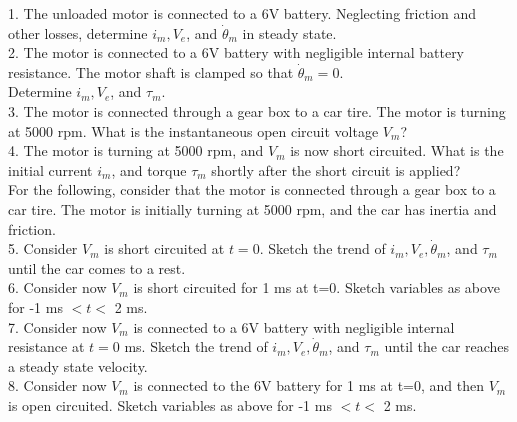 \documentclass[11pt]{article}
\begin{document}
1. The unloaded motor is connected to a 6V battery. 
Neglecting friction and other losses, determine $i_m, V_e$, and $\dot{\theta}_m$ in steady state.\\

2. The motor is connected to a 6V battery with negligible internal battery
resistance. The motor shaft is clamped so that $\dot{\theta}_m = 0$.\\
Determine $i_m, V_e$, and $\tau_m$.\\

3. The motor is connected through a gear box to a car tire. The motor 
is turning at 5000 rpm. What is the instantaneous 
open circuit voltage $V_m$?\\

4. The motor is turning at 5000 rpm, and $V_m$ is now short circuited.
What is the initial current $i_m$, and torque $\tau_m$ shortly 
after the short circuit is applied?\\

For the following, consider that
the motor is connected through a gear box to a car tire. The motor is 
initially turning at 5000 rpm, and the car has inertia and friction.\\

5. Consider $V_m$ is short circuited at $t=0$.
Sketch the trend of $i_m, V_e, \dot{\theta}_m$,
and $\tau_m$  until the car comes to a rest.\\

6. Consider now $V_m$ is short circuited for 1 ms at t=0. 
Sketch variables as above for -1 ms $< t <$ 2 ms.\\

7. Consider now $V_m$ is connected to a 6V battery with 
negligible internal resistance at $t = 0$ ms. 
Sketch the trend of $i_m, V_e, \dot{\theta}_m$,
and $\tau_m$  until the car reaches a steady state velocity.\\

8. Consider now $V_m$ is connected to the 6V battery for 1 ms at t=0, and then
$V_m$ is open circuited. 
Sketch variables as above for -1 ms $< t <$ 2 ms.\\
\end{document}
